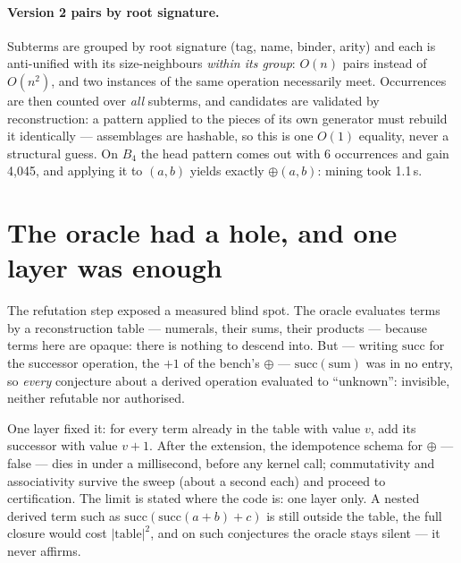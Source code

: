 \documentclass[11pt]{article}
\theoremstyle{remark}\newtheorem{remark}{Remark}
\begin{document}
\paragraph{Version 2 pairs by root signature.} Subterms are grouped by root
signature (tag, name, binder, arity) and each is anti-unified with its
size-neighbours \emph{within its group}: $O(n)$ pairs instead of $O(n^2)$,
and two instances of the same operation necessarily meet. Occurrences are
then counted over \emph{all} subterms, and candidates are validated by
reconstruction: a pattern applied to the pieces of its own generator must
rebuild it identically --- assemblages are hashable, so this is one $O(1)$
equality, never a structural guess. On $B_4$ the head pattern comes out with
6 occurrences and gain 4{,}045, and applying it to $(a,b)$ yields exactly
$\oplus(a,b)$: mining took 1.1\,s.

\section{The oracle had a hole, and one layer was enough}
\label{sec:oracle}

The refutation step exposed a measured blind spot. The oracle evaluates terms
by a reconstruction table --- numerals, their sums, their products --- because
terms here are opaque: there is nothing to descend into. But --- writing
$\mathrm{succ}$ for the successor operation, the $+1$ of the bench's
$\oplus$ --- $\mathrm{succ}(\text{sum})$ was in no entry, so \emph{every} conjecture about
a derived operation evaluated to ``unknown'': invisible, neither refutable
nor authorised.

One layer fixed it: for every term already in the table with value $v$, add
its successor with value $v+1$. After the extension, the idempotence schema
for $\oplus$ --- false --- dies in under a millisecond, before any kernel
call; commutativity and associativity survive the sweep (about a second each)
and proceed to certification. The limit is stated where the code is: one
layer only. A nested derived term such as $\mathrm{succ}(\mathrm{succ}(a+b)+c)$
is still outside the table, the full closure would cost $|\text{table}|^2$,
and on such conjectures the oracle stays silent --- it never affirms.

\end{document}
